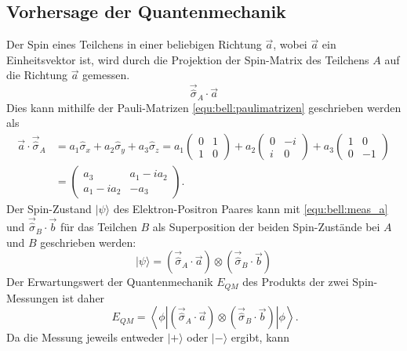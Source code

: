 \begin{refsection}
\subsection{Vorhersage der Quantenmechanik}
Der Spin eines Teilchens in einer beliebigen Richtung $\vec{a}$, wobei $\vec{a}$
ein Einheitsvektor ist, wird durch die
Projektion der Spin-Matrix des Teilchens $A$ auf die 
Richtung $\vec{a}$ gemessen.
\begin{equation}\label{equ:bell:meas_a}
    \vec{\hat{\sigma}}_A \cdot \vec{a}
\end{equation}
Dies kann mithilfe der Pauli-Matrizen \eqref{equ:bell:paulimatrizen} geschrieben
werden als
\begin{align}
    \vec{a} \cdot \vec{\hat{\sigma}}_A &= 
    a_1 \hat{\sigma}_x + a_2 \hat{\sigma}_y + a_3 \hat{\sigma}_z = 
    a_1 \begin{pmatrix} 0 & 1 \\ 1 & 0 \end{pmatrix} +
    a_2 \begin{pmatrix} 0 & -i \\ i & 0 \end{pmatrix} + 
    a_3 \begin{pmatrix} 1 & 0 \\ 0 & -1 \end{pmatrix} \\
    & = \begin{pmatrix}
       a_3 & a_1 - i a_2 \\
       a_1 - i a_2 & -a_3
    \end{pmatrix}. \label{equ:bell:proj_a_s}
\end{align}
Der Spin-Zustand $|\psi\rangle$ des Elektron-Positron Paares kann mit
\eqref{equ:bell:meas_a} und $\vec{\hat{\sigma}}_B \cdot \vec{b}$ 
f\"ur das Teilchen $B$ als Superposition der beiden
Spin-Zust\"ande bei $A$ und $B$ geschrieben werden:
\begin{equation}
    |\psi\rangle = \left( \vec{\hat{\sigma}}_A \cdot \vec{a} \right)
        \otimes \left( \vec{\hat{\sigma}}_B \cdot \vec{b} \right)
\end{equation}
Der Erwartungswert der Quantenmechanik $E_{QM}$ des Produkts der zwei 
Spin-Messungen ist daher
\begin{equation}\
    E_{QM} = \left\langle \phi \left| 
    \left( \vec{\hat{\sigma}}_A \cdot \vec{a} \right)
            \otimes \left( \vec{\hat{\sigma}}_B \cdot \vec{b} \right)
    \right| \phi \right\rangle.
\end{equation}
Da die Messung jeweils entweder $|+\rangle$ oder $|-\rangle$ ergibt, kann

\end{refsection}
